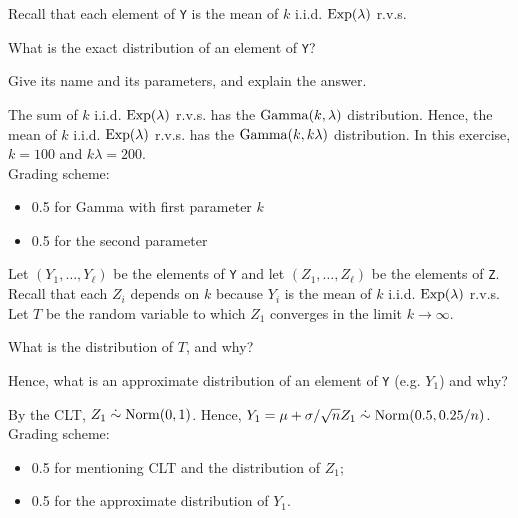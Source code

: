 \vspace*{20pt}


Recall that each element of  \texttt{Y} is the mean of $k$ i.i.d. $\mathrm{Exp}(\lambda)$ r.v.s.

\begin{exercise}[1]
What is the exact distribution of an element of \texttt{Y}? 

Give its name and its parameters, and explain the answer.
\begin{solution}
The sum of $k$ i.i.d.  $\mathrm{Exp}(\lambda)$ r.v.s. has the $\mathrm{Gamma}(k, \lambda)$ distribution.
Hence, the mean of $k$ i.i.d.  $\mathrm{Exp}(\lambda)$ r.v.s. has the $\mathrm{Gamma}(k, k\lambda)$ distribution.
In this exercise, $k=100$ and $k\lambda = 200$. \\ 
Grading scheme:
\begin{itemize}
\item 0.5 for Gamma with first parameter $k$
\item 0.5 for the second parameter
\end{itemize}
\end{solution}
\end{exercise}


\vspace*{30pt}



Let $(Y_1, \ldots, Y_{\ell})$ be the elements of \texttt{Y} and let $(Z_1, \ldots, Z_{\ell})$ be the elements of  \texttt{Z}. Recall that each $Z_i$ depends on $k$ because $Y_i$ is the mean of $k$ i.i.d. $\mathrm{Exp}(\lambda)$ r.v.s. Let $T$ be the random variable to which $Z_1$ converges in the limit  $k \to \infty$.

\begin{exercise}[1]
What is the distribution of $T$, and why? 

Hence, what is an approximate distribution of an element of \texttt{Y} (e.g. $Y_1$) and why?
\begin{solution}
By the CLT, $Z_1 \;\dot{\sim}\; \mathrm{Norm}(0,1)$. Hence,  $Y_1 = \mu + \sigma/\sqrt{n}Z_1 \;\dot{\sim}\; \mathrm{Norm}(0.5,0.25/n)$. \\ 
Grading scheme:
\begin{itemize}
\item 0.5 for mentioning CLT and the distribution of $Z_1$;
\item 0.5 for the approximate distribution of $Y_1$.
\end{itemize}
\end{solution}
\end{exercise}


